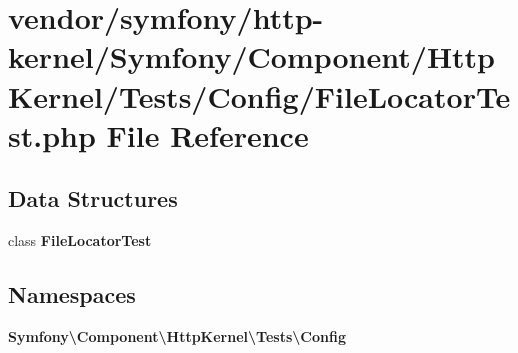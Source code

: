 \section{vendor/symfony/http-\/kernel/\+Symfony/\+Component/\+Http\+Kernel/\+Tests/\+Config/\+File\+Locator\+Test.php File Reference}
\label{_file_locator_test_8php}
\subsection*{Data Structures}
\begin{DoxyCompactItemize}
\item 
class {\bf File\+Locator\+Test}
\end{DoxyCompactItemize}
\subsection*{Namespaces}
\begin{DoxyCompactItemize}
\item 
 {\bf Symfony\textbackslash{}\+Component\textbackslash{}\+Http\+Kernel\textbackslash{}\+Tests\textbackslash{}\+Config}
\end{DoxyCompactItemize}
